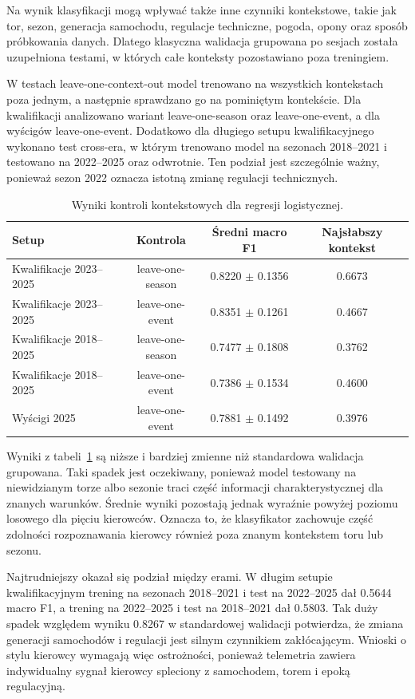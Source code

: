 \documentclass[printmode,pl]{mgr}
\begin{document}
Na wynik klasyfikacji mogą wpływać także inne czynniki kontekstowe, takie jak tor, sezon, generacja samochodu, regulacje techniczne, pogoda, opony oraz sposób próbkowania danych. Dlatego klasyczna walidacja grupowana po sesjach została uzupełniona testami, w których całe konteksty pozostawiano poza treningiem.

W testach leave-one-context-out model trenowano na wszystkich kontekstach poza jednym, a następnie sprawdzano go na pominiętym kontekście. Dla kwalifikacji analizowano wariant leave-one-season oraz leave-one-event, a dla wyścigów leave-one-event. Dodatkowo dla długiego setupu kwalifikacyjnego wykonano test cross-era, w którym trenowano model na sezonach 2018--2021 i testowano na 2022--2025 oraz odwrotnie. Ten podział jest szczególnie ważny, ponieważ sezon 2022 oznacza istotną zmianę regulacji technicznych.

\begin{table}[H]
\centering
\small
\begin{tabular}{lccc}
\toprule
Setup & Kontrola & Średni macro F1 & Najsłabszy kontekst \\
\midrule
Kwalifikacje 2023--2025 & leave-one-season & 0.8220 $\pm$ 0.1356 & 0.6673 \\
Kwalifikacje 2023--2025 & leave-one-event & 0.8351 $\pm$ 0.1261 & 0.4667 \\
Kwalifikacje 2018--2025 & leave-one-season & 0.7477 $\pm$ 0.1808 & 0.3762 \\
Kwalifikacje 2018--2025 & leave-one-event & 0.7386 $\pm$ 0.1534 & 0.4600 \\
Wyścigi 2025 & leave-one-event & 0.7881 $\pm$ 0.1492 & 0.3976 \\
\bottomrule
\end{tabular}
\caption{Wyniki kontroli kontekstowych dla regresji logistycznej.}
\label{tab:context-control}
\end{table}

Wyniki z tabeli~\ref{tab:context-control} są niższe i bardziej zmienne niż standardowa walidacja grupowana. Taki spadek jest oczekiwany, ponieważ model testowany na niewidzianym torze albo sezonie traci część informacji charakterystycznej dla znanych warunków. Średnie wyniki pozostają jednak wyraźnie powyżej poziomu losowego dla pięciu kierowców. Oznacza to, że klasyfikator zachowuje część zdolności rozpoznawania kierowcy również poza znanym kontekstem toru lub sezonu.

Najtrudniejszy okazał się podział między erami. W długim setupie kwalifikacyjnym trening na sezonach 2018--2021 i test na 2022--2025 dał 0.5644 macro F1, a trening na 2022--2025 i test na 2018--2021 dał 0.5803. Tak duży spadek względem wyniku 0.8267 w standardowej walidacji potwierdza, że zmiana generacji samochodów i regulacji jest silnym czynnikiem zakłócającym. Wnioski o stylu kierowcy wymagają więc ostrożności, ponieważ telemetria zawiera indywidualny sygnał kierowcy spleciony z samochodem, torem i epoką regulacyjną.
\end{document}

